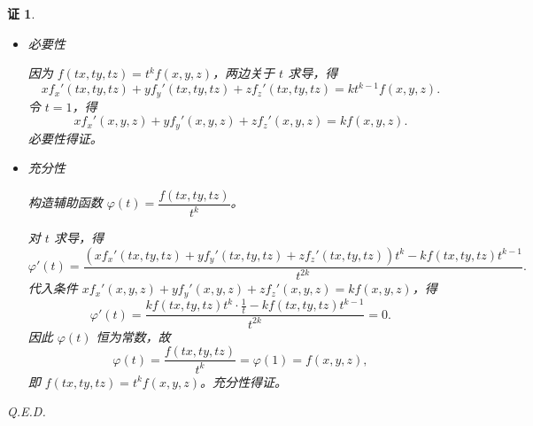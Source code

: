 \documentclass[a4paper,12pt]{article}
\newtheorem*{pf}{证}
\begin{document}
\begin{pf}
    \begin{itemize}
        \item 必要性

              因为 $f(tx,ty,tz) = t^k f(x,y,z)$，两边关于 $t$ 求导，得
              $$
                  xf_x'(tx,ty,tz) + yf_y'(tx,ty,tz) + zf_z'(tx,ty,tz) = kt^{k-1}f(x,y,z).
              $$
              令 $t = 1$，得
              $$
                  xf_x'(x,y,z) + yf_y'(x,y,z) + zf_z'(x,y,z) = kf(x,y,z).
              $$
              必要性得证。

        \item 充分性

              构造辅助函数 $\varphi(t) = \dfrac{f(tx,ty,tz)}{t^k}$。

              对 $t$ 求导，得
              $$
                  \varphi'(t) = \frac{(xf_x'(tx,ty,tz) + yf_y'(tx,ty,tz) + zf_z'(tx,ty,tz))t^k - kf(tx,ty,tz)t^{k-1}}{t^{2k}}.
              $$
              代入条件 $xf_x'(x,y,z) + yf_y'(x,y,z) + zf_z'(x,y,z) = kf(x,y,z)$，得
              $$
                  \varphi'(t) = \frac{kf(tx,ty,tz)t^k \cdot \frac{1}{t} - kf(tx,ty,tz)t^{k-1}}{t^{2k}} = 0.
              $$
              因此 $\varphi(t)$ 恒为常数，故
              $$
                  \varphi(t) = \frac{f(tx,ty,tz)}{t^k} = \varphi(1) = f(x,y,z),
              $$
              即 $f(tx,ty,tz) = t^k f(x,y,z)$。充分性得证。
    \end{itemize}

    Q.E.D.
\end{pf}
\end{document}
